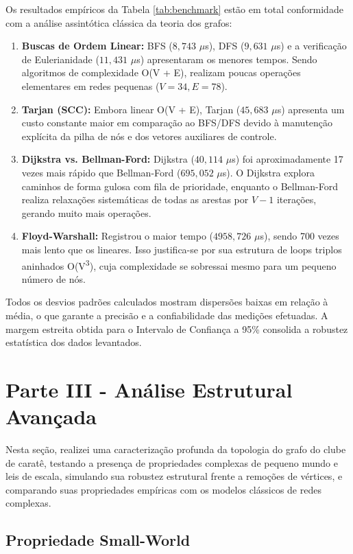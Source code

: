\documentclass[sigconf]{webmedia}
\begin{document}
Os resultados empíricos da Tabela \ref{tab:benchmark} estão em total conformidade com a análise assintótica clássica da teoria dos grafos:
\begin{enumerate}
    \item \textbf{Buscas de Ordem Linear:} BFS ($8,743$ $\mu$s), DFS ($9,631$ $\mu$s) e a verificação de Eulerianidade ($11,431$ $\mu$s) apresentaram os menores tempos. Sendo algoritmos de complexidade O(V + E), realizam poucas operações elementares em redes pequenas ($V=34, E=78$).
    \item \textbf{Tarjan (SCC):} Embora linear O(V + E), Tarjan ($45,683$ $\mu$s) apresenta um custo constante maior em comparação ao BFS/DFS devido à manutenção explícita da pilha de nós e dos vetores auxiliares de controle.
    \item \textbf{Dijkstra vs. Bellman-Ford:} Dijkstra ($40,114$ $\mu$s) foi aproximadamente 17 vezes mais rápido que Bellman-Ford ($695,052$ $\mu$s). O Dijkstra explora caminhos de forma gulosa com fila de prioridade, enquanto o Bellman-Ford realiza relaxações sistemáticas de todas as arestas por $V-1$ iterações, gerando muito mais operações.
    \item \textbf{Floyd-Warshall:} Registrou o maior tempo ($4958,726$ $\mu$s), sendo 700 vezes mais lento que os lineares. Isso justifica-se por sua estrutura de loops triplos aninhados O(V\textsuperscript{3}), cuja complexidade se sobressai mesmo para um pequeno número de nós.
\end{enumerate}

Todos os desvios padrões calculados mostram dispersões baixas em relação à média, o que garante a precisão e a confiabilidade das medições efetuadas. A margem estreita obtida para o Intervalo de Confiança a 95\% consolida a robustez estatística dos dados levantados.

\section{Parte III - Análise Estrutural Avançada}
\label{sec:parte_iii}

Nesta seção, realizei uma caracterização profunda da topologia do grafo do clube de caratê, testando a presença de propriedades complexas de pequeno mundo e leis de escala, simulando sua robustez estrutural frente a remoções de vértices, e comparando suas propriedades empíricas com os modelos clássicos de redes complexas.

\subsection{Propriedade Small-World}
\label{subsec:small_world}
\end{document}

